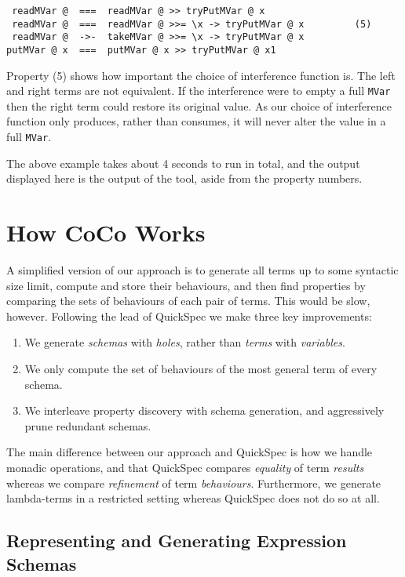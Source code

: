 \begin{verbatim}
 readMVar @  ===  readMVar @ >> tryPutMVar @ x
 readMVar @  ===  readMVar @ >>= \x -> tryPutMVar @ x         (5)
 readMVar @  ->-  takeMVar @ >>= \x -> tryPutMVar @ x
putMVar @ x  ===  putMVar @ x >> tryPutMVar @ x1
\end{verbatim}

\noindent
Property (5) shows how important the choice of interference function
is.  The left and right terms are not equivalent.  If the interference
were to empty a full \verb|MVar| then the right term could restore its
original value.  As our choice of interference function only produces,
rather than consumes, it will never alter the value in a full
\verb|MVar|.

The above example takes about 4 seconds to run in total, and the
output displayed here is the output of the tool, aside from the
property numbers.

\section{How CoCo Works}
\label{sec:coco-hiw}

A simplified version of our approach is to generate all terms up to
some syntactic size limit, compute and store their behaviours, and
then find properties by comparing the sets of behaviours of each pair
of terms.  This would be slow, however.  Following the lead of
QuickSpec\cite{claessen2010,smallbone2017} we make three key
improvements:

\begin{enumerate}
\item We generate \emph{schemas} with \emph{holes}, rather than
  \emph{terms} with \emph{variables}.
\item We only compute the set of behaviours of the most general term
  of every schema.
\item We interleave property discovery with schema generation, and
  aggressively prune redundant schemas.
\end{enumerate}

The main difference between our approach and QuickSpec is how we
handle monadic operations, and that QuickSpec compares \emph{equality}
of term \emph{results} whereas we compare \emph{refinement} of term
\emph{behaviours}.  Furthermore, we generate lambda-terms in a
restricted setting whereas QuickSpec does not do so at all.

\subsection{Representing and Generating Expression Schemas}
\label{sec:coco-hiw-gen}

